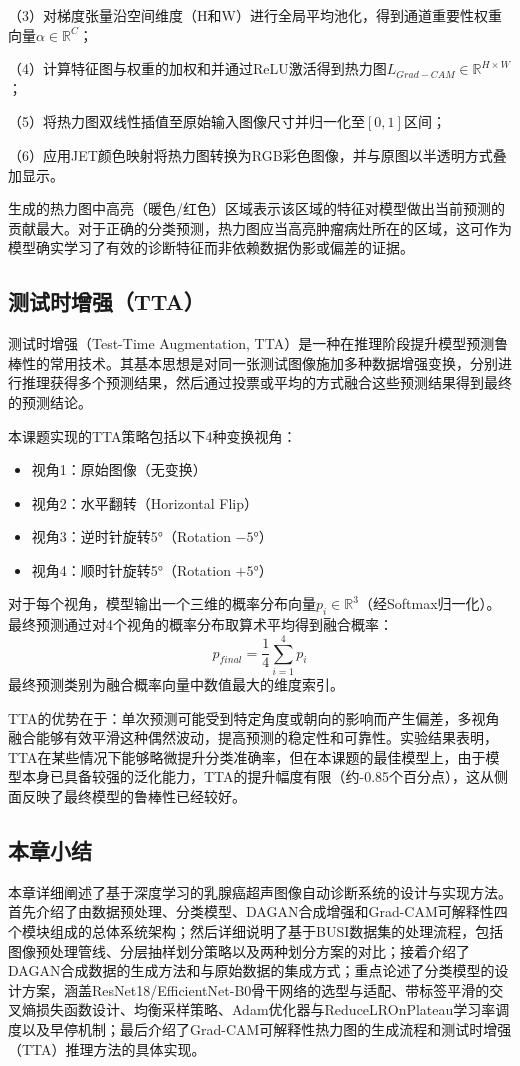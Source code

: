 （3）对梯度张量沿空间维度（H和W）进行全局平均池化，得到通道重要性权重向量$\alpha \in \mathbb{R}^C$；

（4）计算特征图与权重的加权和并通过ReLU激活得到热力图$L_{Grad-CAM} \in \mathbb{R}^{H \times W}$；

（5）将热力图双线性插值至原始输入图像尺寸并归一化至$[0, 1]$区间；

（6）应用JET颜色映射将热力图转换为RGB彩色图像，并与原图以半透明方式叠加显示。

生成的热力图中高亮（暖色/红色）区域表示该区域的特征对模型做出当前预测的贡献最大。对于正确的分类预测，热力图应当高亮肿瘤病灶所在的区域，这可作为模型确实学习了有效的诊断特征而非依赖数据伪影或偏差的证据。


\subsection{测试时增强（TTA）}

测试时增强（Test-Time Augmentation, TTA）是一种在推理阶段提升模型预测鲁棒性的常用技术。其基本思想是对同一张测试图像施加多种数据增强变换，分别进行推理获得多个预测结果，然后通过投票或平均的方式融合这些预测结果得到最终的预测结论。

本课题实现的TTA策略包括以下4种变换视角：
\begin{itemize}
    \item 视角1：原始图像（无变换）
    \item 视角2：水平翻转（Horizontal Flip）
    \item 视角3：逆时针旋转5°（Rotation $-5°$）
    \item 视角4：顺时针旋转5°（Rotation $+5°$）
\end{itemize}

对于每个视角，模型输出一个三维的概率分布向量$p_i \in \mathbb{R}^3$（经Softmax归一化）。最终预测通过对4个视角的概率分布取算术平均得到融合概率：
\begin{equation}
    \label{eq:tta}
    p_{final} = \frac{1}{4}\sum_{i=1}^{4} p_i
\end{equation}
最终预测类别为融合概率向量中数值最大的维度索引。

TTA的优势在于：单次预测可能受到特定角度或朝向的影响而产生偏差，多视角融合能够有效平滑这种偶然波动，提高预测的稳定性和可靠性。实验结果表明，TTA在某些情况下能够略微提升分类准确率，但在本课题的最佳模型上，由于模型本身已具备较强的泛化能力，TTA的提升幅度有限（约-0.85个百分点），这从侧面反映了最终模型的鲁棒性已经较好。


\subsection{本章小结}

本章详细阐述了基于深度学习的乳腺癌超声图像自动诊断系统的设计与实现方法。首先介绍了由数据预处理、分类模型、DAGAN合成增强和Grad-CAM可解释性四个模块组成的总体系统架构；然后详细说明了基于BUSI数据集的处理流程，包括图像预处理管线、分层抽样划分策略以及两种划分方案的对比；接着介绍了DAGAN合成数据的生成方法和与原始数据的集成方式；重点论述了分类模型的设计方案，涵盖ResNet18/EfficientNet-B0骨干网络的选型与适配、带标签平滑的交叉熵损失函数设计、均衡采样策略、Adam优化器与ReduceLROnPlateau学习率调度以及早停机制；最后介绍了Grad-CAM可解释性热力图的生成流程和测试时增强（TTA）推理方法的具体实现。
